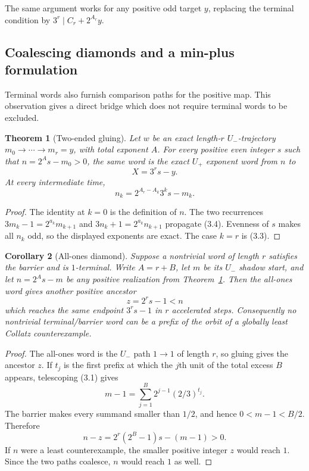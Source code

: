 \documentclass[11pt,reqno]{amsart}
\newtheorem{theorem}{Theorem}[section]
\newtheorem{corollary}[theorem]{Corollary}
\theoremstyle{remark}
\newcommand{\Up}{U_{+}}
\newcommand{\Um}{U_{-}}
\begin{document}
The same argument works for any positive odd target $y$, replacing the
terminal condition by $3^r\mid C_r+2^{A_r}y$.

\subsection{Coalescing diamonds and a min-plus formulation}

Terminal words also furnish comparison paths for the positive map.  This
observation gives a direct bridge which does not require terminal words to be
excluded.

\begin{theorem}[Two-ended gluing]\label{thm:gluing}
Let $w$ be an exact length-$r$ $\Um$-trajectory
$m_0\to\cdots\to m_r=y$, with total exponent $A$.  For every positive even integer
$s$ such that $n=2^As-m_0>0$, the same word is the exact $\Up$ exponent word
from $n$ to
\[
 X=3^rs-y.                                            \tag{3.3}
\]
At every intermediate time,
\[
 n_k=2^{A_r-A_k}3^ks-m_k.                             \tag{3.4}
\]
\end{theorem}

\begin{proof}
The identity at $k=0$ is the definition of $n$.  The two recurrences
$3m_k-1=2^{a_k}m_{k+1}$ and
$3n_k+1=2^{a_k}n_{k+1}$ propagate (3.4).  Evenness of $s$ makes all $n_k$
odd, so the displayed exponents are exact.  The case $k=r$ is (3.3).
\end{proof}

\begin{corollary}[All-ones diamond]\label{cor:diamond}
Suppose a nontrivial word of length $r$ satisfies the barrier and is
$1$-terminal.  Write $A=r+B$, let $m$ be its $\Um$ shadow start, and let
$n=2^As-m$ be any positive realization from Theorem~\ref{thm:gluing}.
Then the all-ones word gives another positive ancestor
\[
 z=2^rs-1<n                                             \tag{3.5}
\]
which reaches the same endpoint $3^rs-1$ in $r$ accelerated steps.
Consequently no nontrivial terminal/barrier word can be a prefix of the orbit
of a globally least Collatz counterexample.
\end{corollary}

\begin{proof}
The all-ones word is the $\Um$ path $1\to1$ of length $r$, so gluing gives
the ancestor $z$.  If $t_j$ is the first prefix at which the $j$th unit of
the total excess $B$ appears, telescoping (3.1) gives
\[
 m-1=\sum_{j=1}^B2^{j-1}(2/3)^{t_j}.
\]
The barrier makes every summand smaller than $1/2$, and hence
$0<m-1<B/2$.  Therefore
\[
 n-z=2^r(2^B-1)s-(m-1)>0.
\]
If $n$ were a least counterexample, the smaller positive integer $z$ would
reach $1$.  Since the two paths coalesce, $n$ would reach $1$ as well.
\end{proof}
\end{document}
